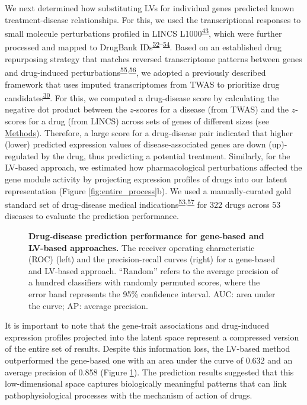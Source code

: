 \documentclass[
  a4paper,
]{article}
\begin{document}
We next determined how substituting LVs for individual genes predicted known treatment-disease relationships.
For this, we used the transcriptional responses to small molecule perturbations profiled in LINCS L1000\textsuperscript{\protect\hyperlink{ref-F7lIlh2N}{43}}, which were further processed and mapped to DrugBank IDs\textsuperscript{\protect\hyperlink{ref-6PR8LEXK}{52}--\protect\hyperlink{ref-1DJZvtwP1}{54}}.
Based on an established drug repurposing strategy that matches reversed transcriptome patterns between genes and drug-induced perturbations\textsuperscript{\protect\hyperlink{ref-1ClBKizD7}{55},\protect\hyperlink{ref-mZjkE1xU}{56}}, we adopted a previously described framework that uses imputed transcriptomes from TWAS to prioritize drug candidates\textsuperscript{\protect\hyperlink{ref-17oeJ0CXy}{30}}.
For this, we computed a drug-disease score by calculating the negative dot product between the \(z\)-scores for a disease (from TWAS) and the \(z\)-scores for a drug (from LINCS) across sets of genes of different sizes (see \protect\hyperlink{sec:methods:drug}{Methods}).
Therefore, a large score for a drug-disease pair indicated that higher (lower) predicted expression values of disease-associated genes are down (up)-regulated by the drug, thus predicting a potential treatment.
Similarly, for the LV-based approach, we estimated how pharmacological perturbations affected the gene module activity by projecting expression profiles of drugs into our latent representation (Figure \ref{fig:entire_process}b).
We used a manually-curated gold standard set of drug-disease medical indications\textsuperscript{\protect\hyperlink{ref-O21tn8vf}{53},\protect\hyperlink{ref-10KA5jTBQ}{57}} for 322 drugs across 53 diseases to evaluate the prediction performance.

\begin{figure}
\hypertarget{fig:drug_disease:roc_pr}{%
\centering

\caption{\textbf{Drug-disease prediction performance for gene-based and LV-based approaches.}
The receiver operating characteristic (ROC) (left) and the precision-recall curves (right) for a gene-based and LV-based approach.
``Random'' refers to the average precision of a hundred classifiers with randomly permuted scores, where the error band represents the 95\% confidence interval.
AUC: area under the curve; AP: average precision.}\label{fig:drug_disease:roc_pr}
}
\end{figure}

It is important to note that the gene-trait associations and drug-induced expression profiles projected into the latent space represent a compressed version of the entire set of results.
Despite this information loss, the LV-based method outperformed the gene-based one with an area under the curve of 0.632 and an average precision of 0.858 (Figure \ref{fig:drug_disease:roc_pr}).
The prediction results suggested that this low-dimensional space captures biologically meaningful patterns that can link pathophysiological processes with the mechanism of action of drugs.
\end{document}

